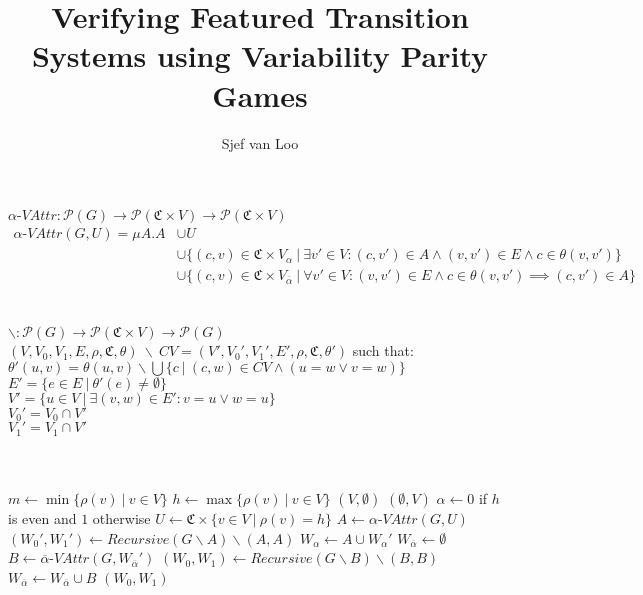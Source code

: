\documentclass[]{article}
\title{Verifying Featured Transition Systems using Variability Parity Games}
\author{Sjef van Loo}
\begin{document}
$\alpha\textit{-VAttr} : \mathcal{P}(G) \rightarrow \mathcal{P}(\mathfrak{C} \times V) \rightarrow \mathcal{P}(\mathfrak{C} \times V)$\\
\begin{align*}
\alpha\textit{-VAttr}(G, U) = \mu A . A &\cup U \\
& \cup \{(c,v) \in \mathfrak{C} \times V_\alpha\ |\ \exists v' \in V : (c, v') \in A \wedge (v, v') \in E \wedge c \in \theta(v,v') \}\\
& \cup \{(c,v) \in \mathfrak{C} \times V_{\overline{\alpha}}\ |\ \forall v' \in V : (v,v') \in E \wedge c \in \theta(v,v') \implies (c, v') \in A \}
\end{align*}\\\\

$\backslash : \mathcal{P}(G) \rightarrow \mathcal{P}(\mathfrak{C} \times V) \rightarrow \mathcal{P}(G)$\\
$(V, V_0, V_1, E, \rho, \mathfrak{C}, \theta)\ \backslash\ CV = (V', V_0', V_1', E', \rho, \mathfrak{C}, \theta')$ such that:\\
$\theta'(u,v) = \theta(u,v) \backslash \bigcup\{c\ |\ (c,w) \in CV \wedge (u = w \vee v = w)\}$\\
$E' = \{e \in E\ |\ \theta'(e) \neq \emptyset \}$\\
$V' = \{u \in V\ |\ \exists (v,w) \in E' : v = u \vee w = u\}$\\
$V_0' = V_0 \cap V'$\\
$V_1' = V_1 \cap V'$\\\\\\
\begin{algorithmic}[1]
	\State $m \gets \min\{ \rho(v)\ |\ v \in V\}$
	\State $h \gets\max\{ \rho(v)\ |\ v \in V\}$
			\State \Return $(V,\emptyset)$
		\Else
			\State \Return $(\emptyset, V)$
		\EndIf
	\EndIf
	\State $\alpha \gets 0$ if $h$ is even and $1$ otherwise
	\State $U \gets \mathfrak{C} \times \{v \in V\ |\ \rho(v) = h\}$
	\State $A \gets \alpha\textit{-VAttr}(G, U)$
	\State $(W_0', W_1') \gets \textit{Recursive}(G \backslash A) \backslash (A,A)$
		\State $W_\alpha \gets A \cup W_\alpha'$
		\State $W_{\overline{\alpha}} \gets \emptyset$
	\Else
		\State $B \gets \overline{\alpha}\textit{-VAttr}(G,W_{\overline{\alpha}}')$
		\State $(W_0, W_1) \gets \textit{Recursive}(G \backslash B) \backslash (B,B)$
		\State $W_{\overline{\alpha}} \gets W_{\overline{\alpha}} \cup B$
	\EndIf
	\State \Return $(W_0, W_1)$
\end{algorithmic}
\end{document}
